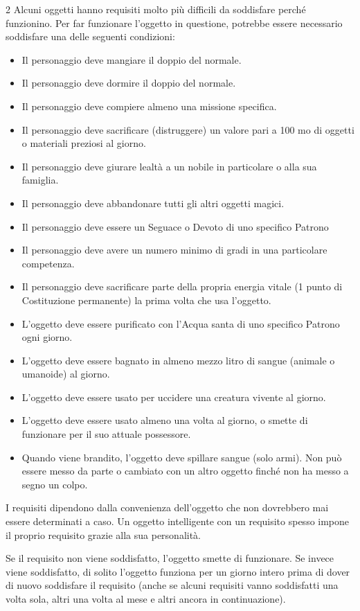 \begin{multicols}{2}
Alcuni oggetti hanno requisiti molto più difficili da soddisfare perché funzionino. Per far funzionare l'oggetto in questione, potrebbe essere necessario soddisfare una delle seguenti condizioni:

\begin{itemize}[leftmargin=*] \setlength{\itemsep}{0pt}
\item Il personaggio deve mangiare il doppio del normale.
\item Il personaggio deve dormire il doppio del normale.
\item Il personaggio deve compiere almeno una missione specifica.
\item Il personaggio deve sacrificare (distruggere) un valore pari a 100 mo di oggetti o materiali preziosi al giorno.
\item Il personaggio deve giurare lealtà a un nobile in particolare o alla sua famiglia.
\item Il personaggio deve abbandonare tutti gli altri oggetti magici.
\item Il personaggio deve essere un Seguace o Devoto di uno specifico Patrono
\item Il personaggio deve avere un numero minimo di gradi in una particolare competenza.
\item Il personaggio deve sacrificare parte della propria energia vitale (1 punto di Costituzione permanente) la prima volta che usa l'oggetto.
\item L'oggetto deve essere purificato con l'Acqua santa di uno specifico Patrono ogni giorno.
\item L'oggetto deve essere bagnato in almeno mezzo litro di sangue (animale o umanoide) al giorno.
\item L'oggetto deve essere usato per uccidere una creatura vivente al giorno.
\item L'oggetto deve essere usato almeno una volta al giorno, o smette di funzionare per il suo attuale possessore.
\item Quando viene brandito, l'oggetto deve spillare sangue (solo armi). Non può essere messo da parte o cambiato con un altro oggetto finché non ha messo a segno un colpo.
\end{itemize}

I requisiti dipendono dalla convenienza dell'oggetto che non dovrebbero mai essere determinati a caso. Un oggetto intelligente con un requisito spesso impone il proprio requisito grazie alla sua personalità.

Se il requisito non viene soddisfatto, l'oggetto smette di funzionare. Se invece viene soddisfatto, di solito l'oggetto funziona per un giorno intero prima di dover di nuovo soddisfare il requisito (anche se alcuni requisiti vanno soddisfatti una volta sola, altri una volta al mese e altri ancora in continuazione).


\end{multicols}
